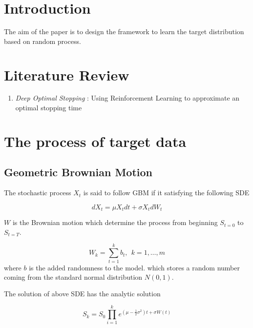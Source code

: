 \documentclass{article}
\begin{document}
		\section{Introduction}
		The aim of the paper is to design the framework to learn the target distribution based on random process.
		\section{Literature Review}
			\begin{enumerate}
				\item \textit{Deep Optimal Stopping} \cite{becker} : Using Reinforcement Learning to approximate an optimal stopping time
			\end{enumerate}
		
		\section{The process of target data}
		\subsection{Geometric Brownian Motion}
		
				The stochastic process $X_t$ is said to follow GBM if it satisfying the following SDE
				
				\begin{equation}
					dX_t = \mu X_tdt + \sigma X_t dW_t 
				\end{equation}
				
				$W$ is the Brownian motion which determine the process from beginning $S_{t=0}$ to $S_{t=T}$.
				
				\begin{equation}
					W_{k} = \sum_{t=1}^{k} b_{t}, \ \ k = 1, \dots, m
				\end{equation}
				 where $b$ is the added randomness to the model.
				 which stores a random number coming from the standard normal distribution $N(0, 1)$.
			
			The solution of above SDE has the analytic solution
			
			\begin{equation}
				S_{k} = S_{0} \prod_{i=1}^{k}e^{\left(\mu-\frac{1}{2}\sigma^{2}\right)t+\sigma W(t)}
				\label{eq:bm_process}
			\end{equation}
			
\end{document}
